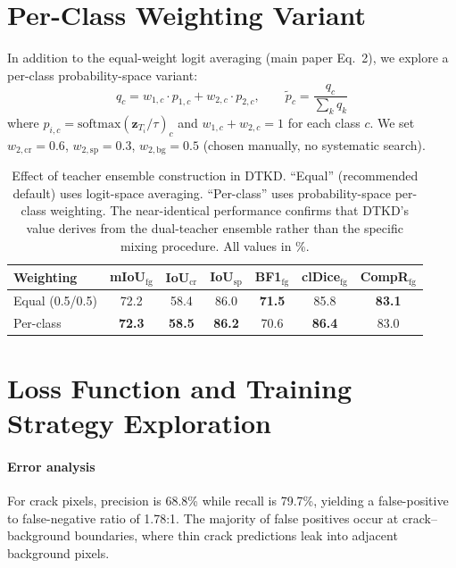 \documentclass[review,authoryear]{elsarticle}
\begin{document}
\section{Per-Class Weighting Variant}
\label{sec:supp_perclass}

In addition to the equal-weight logit averaging (main paper Eq.~2), we explore a per-class probability-space variant:
\begin{equation}
    q_c = w_{1,c} \cdot p_{1,c} + w_{2,c} \cdot p_{2,c}, \qquad
    \tilde{p}_c = \frac{q_c}{\sum_{k} q_k}
    \label{eq:supp_perclass}
\end{equation}
where $p_{i,c} = \text{softmax}(\mathbf{z}_{T_i} / \tau)_c$ and $w_{1,c} + w_{2,c} = 1$ for each class $c$. We set $w_{2,\text{cr}} = 0.6$, $w_{2,\text{sp}} = 0.3$, $w_{2,\text{bg}} = 0.5$ (chosen manually, no systematic search).

\begin{table}[t]
\centering
\caption{Effect of teacher ensemble construction in DTKD. ``Equal'' (recommended default) uses logit-space averaging. ``Per-class'' uses probability-space per-class weighting. The near-identical performance confirms that DTKD's value derives from the dual-teacher ensemble rather than the specific mixing procedure. All values in \%.}
\label{tab:supp_kd_weights}
\begin{tabular}{lcccccc}
\toprule
Weighting & mIoU$_{\text{fg}}$ & IoU$_{\text{cr}}$ & IoU$_{\text{sp}}$ & BF1$_{\text{fg}}$ & clDice$_{\text{fg}}$ & CompR$_{\text{fg}}$ \\
\midrule
Equal (0.5/0.5) & 72.2 & 58.4 & 86.0 & \textbf{71.5} & 85.8 & \textbf{83.1} \\
Per-class & \textbf{72.3} & \textbf{58.5} & \textbf{86.2} & 70.6 & \textbf{86.4} & 83.0 \\
\bottomrule
\end{tabular}
\end{table}

\section{Loss Function and Training Strategy Exploration}
\label{sec:supp_strategy}

\paragraph{Error analysis}
For crack pixels, precision is 68.8\% while recall is 79.7\%, yielding a false-positive to false-negative ratio of 1.78:1.
The majority of false positives occur at crack--background boundaries, where thin crack predictions leak into adjacent background pixels.
\end{document}
